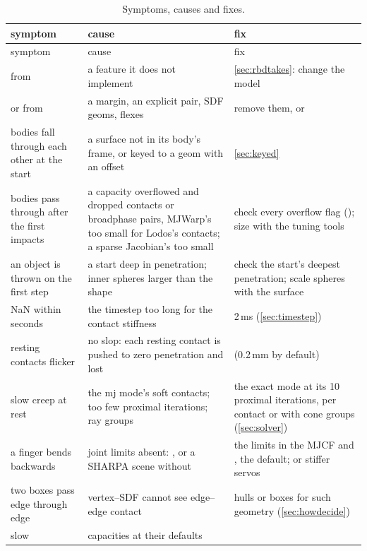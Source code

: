 \begin{longtable}{@{}L{45mm}L{50mm}L{56mm}@{}}
\caption{Symptoms, causes and fixes.}\label{tab:trouble}\\
\toprule
symptom & cause & fix \\
\midrule
\endfirsthead
\toprule
symptom & cause & fix \\
\midrule
\endhead
{} from  & a feature it does not implement & \cref{sec:rbdtakes}: change the model \\
 or  from  & a margin, an explicit pair, SDF geoms, flexes & remove them, or  \\
bodies fall through each other at the start & a surface not in its body's frame, or keyed to a geom with an offset & \cref{sec:keyed} \\
bodies pass through after the first impacts & a capacity overflowed and dropped contacts or broadphase pairs, MJWarp's too small for Lodos's contacts; a sparse Jacobian's  too small & check every overflow flag (); size with the tuning tools \\
an object is thrown on the first step & a start deep in penetration; inner spheres larger than the shape & check the start's deepest penetration; scale spheres with the surface \\
NaN within seconds & the timestep too long for the contact stiffness & 2\,ms (\cref{sec:timestep}) \\
resting contacts flicker & no slop: each resting contact is pushed to zero penetration and lost &  (0.2\,mm by default) \\
slow creep at rest & the mj mode's soft contacts; too few proximal iterations; ray groups & the exact mode at its 10 proximal iterations, per contact or with cone groups (\cref{sec:solver}) \\
a finger bends backwards & joint limits absent: , or a SHARPA scene without  & the limits in the MJCF and , the default; or stiffer servos \\
two boxes pass edge through edge & vertex--SDF cannot see edge--edge contact & hulls or boxes for such geometry (\cref{sec:howdecide}) \\
slow & capacities at their defaults &  \\
\bottomrule
\end{longtable}

